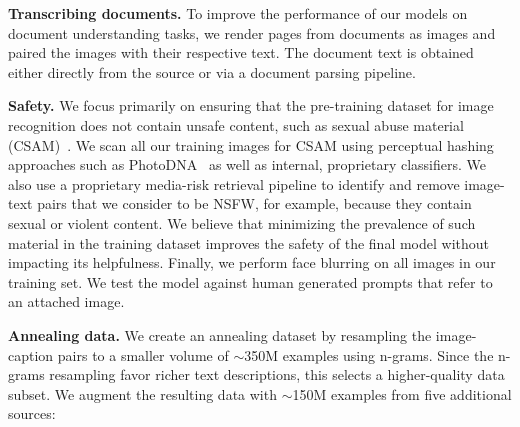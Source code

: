 \documentclass[dvipsnames]{fairmeta}
\begin{document}
\textbf{Transcribing documents.} To improve the performance of our models on document understanding tasks, we render pages from documents as images and paired the images with their respective text. The document text is obtained either directly from the source or via a document parsing pipeline.

\textbf{Safety.}
We focus primarily on ensuring that the pre-training dataset for image recognition does not contain unsafe content, such as sexual abuse material (CSAM)~\citep{thiel2023csam}. We scan all our training images for CSAM using perceptual hashing approaches such as PhotoDNA~\citep{farid2021overview} as well as internal, proprietary classifiers.
We also use a proprietary media-risk retrieval pipeline to identify and remove image-text pairs that we consider to be NSFW, for example, because they contain sexual or violent content.
We believe that minimizing the prevalence of such material in the training dataset improves the safety of the final model without impacting its helpfulness.
Finally, we perform face blurring on all images in our training set.
We test the model against human generated prompts that refer to an attached image.

\textbf{Annealing data.} We create an annealing dataset by resampling the image-caption pairs to a smaller volume of $\sim$350M examples using n-grams.
Since the n-grams resampling favor richer text descriptions, this selects a higher-quality data subset.
We augment the resulting data with $\sim$150M examples from five additional sources:
\end{document}
